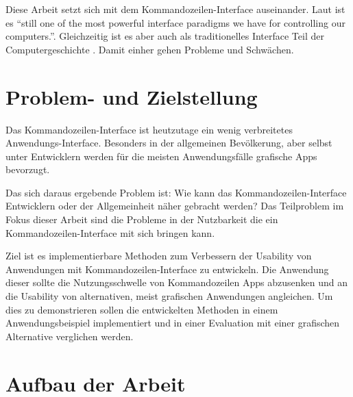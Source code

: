 \documentclass[oneside,bibliography=totocnumbered,BCOR=5mm]{scrbook}
\begin{document}
Diese Arbeit setzt sich mit dem Kommandozeilen-Interface auseinander. Laut
\cite{Raskin_2008} ist es ``still one of the most powerful interface paradigms
we have for controlling our computers.''. Gleichzeitig ist es aber auch als
traditionelles Interface Teil der Computergeschichte \parencite{nielson1993}.
Damit einher gehen Probleme und Schwächen.

\section{Problem- und Zielstellung}

\label{sec:problem}

Das Kommandozeilen-Interface ist heutzutage ein wenig verbreitetes
Anwendungs-Interface. Besonders in der allgemeinen Bevölkerung, aber selbst
unter Entwicklern werden für die meisten Anwendungsfälle grafische Apps
bevorzugt.

Das sich daraus ergebende Problem ist: Wie kann das Kommandozeilen-Interface
Entwicklern oder der Allgemeinheit näher gebracht werden? Das Teilproblem
im Fokus dieser Arbeit sind die Probleme in der Nutzbarkeit die ein
Kommandozeilen-Interface mit sich bringen kann.

Ziel ist es implementierbare Methoden zum Verbessern der Usability von
Anwendungen mit Kommandozeilen-Interface zu entwickeln. Die Anwendung dieser
sollte die Nutzungsschwelle von Kommandozeilen Apps abzusenken und an die
Usability von alternativen, meist grafischen Anwendungen angleichen. Um dies
zu demonstrieren sollen die entwickelten Methoden in einem Anwendungsbeispiel
implementiert und in einer Evaluation mit einer grafischen Alternative
verglichen werden.

\newpage
\section{Aufbau der Arbeit}
\end{document}
